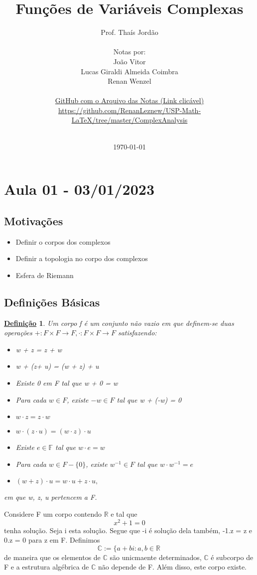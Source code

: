 \documentclass{article}
\title{Fun\c c\~oes de Vari\'aveis Complexas}
\author{Prof. Tha\'is Jord\~ao\\
  \vspace{2cm}\\
  Notas por:\\
  Jo\~ao Vitor\\
  Lucas Giraldi Almeida Coimbra\\
  Renan Wenzel\\
  \vspace{4cm}\\
  \href{https://github.com/RenanLeznew/USP-Math-LaTeX/tree/master/ComplexAnalysis}{GitHub com o Arquivo das Notas (Link clic\'avel)}\\
  \url{https://github.com/RenanLeznew/USP-Math-LaTeX/tree/master/ComplexAnalysis}\\
  \vspace{4cm}\\
}
\date{\today}
\newtheorem*{def*}{\underline{Defini\c c\~ao}}
\begin{document}
  \maketitle
  \newpage
  \tableofcontents
  \newpage

  \section{Aula 01 - 03/01/2023}
  \subsection{Motiva\c c\~oes}
  \begin{itemize}
   \item Definir o corpos dos complexos
   \item Definir a topologia no corpo dos complexos
   \item Esfera de Riemann
  \end{itemize}

  \subsection{Defini\c c\~oes B\'asicas}
  \begin{def*}
    Um corpo f \'e um conjunto n\~ao vazio em que definem-se duas opera\c c\~oes $+:F\times{F}\rightarrow F, \cdot:F\times{F}\rightarrow F$ satisfazendo:
  \begin{itemize}
    \item[i)] w + z = z + w
    \item[ii)] w + (z+ u) = (w + z) + u
    \item[iii)] Existe 0 em F tal que w + 0 = w
    \item[iv)] Para cada $w\in F$, existe $-w \in F$ tal que w + (-w) = 0
    \item[v)] $w\cdot z = z\cdot w$
    \item[vi)] $w\cdot(z\cdot u) = (w\cdot z)\cdot u$
    \item[vii)] Existe $e\in \mathbb{F}$ tal que $w\cdot{e} = w$
    \item[viii)] Para cada $w\in{F-\{0\}}$, existe $w ^{-1}\in{F}$ tal que $w\cdot w ^{-1} = e$
    \item[ix)] $(w+z)\cdot{u} = w\cdot u + z\cdot u,$
  \end{itemize}
  em que w, z, u pertencem a F.
  \end{def*}
  Considere F um corpo contendo $\mathbb{R}$ e tal que 
  $$
  x ^{2} + 1 = 0
  $$
tenha solu\c c\~ao. Seja i esta solu\c c\~ao. Segue que -i \'e solu\c c\~ao dela tamb\'em, -1.z = z e 0.z = 0 para z em F. Definimos
  $$
  \mathbb{C}:= \{a + bi: a, b\in \mathbb{R}\,
  $$
de maneira que os elementos de $\mathbb{C}$ s\~ao unicmaente determinados, $\mathbb{C}$ \'e subcorpo de F e a estrutura 
alg\'ebrica de $\mathbb{C}$ n\~ao depende de F. Al\'em disso, este corpo existe.
\end{document}
